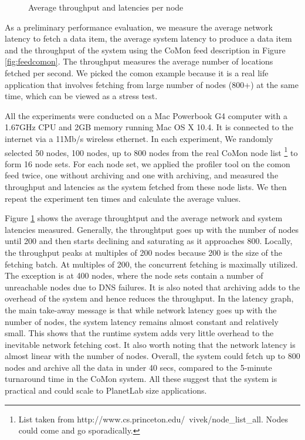 \begin{figure}[th]
\begin{center}
\caption{Average throughput and latencies per node}
\label{fig:throughput}
\end{center}
\end{figure}

As a preliminary performance evaluation, 
we measure the average network latency
to fetch a data item, the average system latency 
to produce a data item
and the throughput of the system using the CoMon feed
description in Figure \ref{fig:feedcomon}. 
The throughput measures the average
number of locations fetched per second. We picked
the comon example because it is a real life
application that involves fetching from large number of 
nodes (800+) at the same time, which can be viewed as a stress test. 

All the experiments were conducted on a Mac Powerbook G4 computer
with a 1.67GHz CPU and 2GB memory running Mac OS X 10.4. It is
connected to the internet via a 11Mb/s wireless ethernet.
In each experiment, We randomly selected 50 nodes,
100 nodes, up to 800 nodes from the real CoMon node list 
\footnote{List taken from http://www.cs.princeton.edu/~vivek/node\_list\_all. 
Nodes could come and go sporadically.} to form
16 node sets. For each node set,
we applied the profiler tool on the comon feed twice, one without
archiving and one with archiving, and measured the throughput
and latencies as the system fetched from these node lists. 
We then repeat the experiment ten times and calculate the average values.

Figure \ref{fig:throughput} shows the average throughtput
and the average network and system latencies measured.
Generally, the throughtput goes up with the number of nodes
until 200 and then starts declining and saturating
as it approaches 800. Locally, the throughput peaks at
multiples of 200 nodes because 200 is the size of the
fetching batch. At multiples of 200, the concurrent
fetching is maximally utilized. The exception is
at 400 nodes, where the node sets contain a number of
unreachable nodes due to DNS failures. It is also noted that
archiving adds to the overhead of the system and hence
reduces the throughput. 
In the latency graph, the main take-away message is that
while network latency goes up with the number of nodes,
the system latency remains almost constant and relatively
small. This shows that the \padsd{} runtime system adds
very little overhead to the inevitable network fetching
cost. It also worth noting that the network latency is
almost linear with the number of nodes. Overall, the system
could fetch up to 800 nodes and archive all the data in under 
40 secs, compared to the 5-minute turnaround time in the 
CoMon system. All these suggest that the system is practical
and could scale to PlanetLab size applications. 

